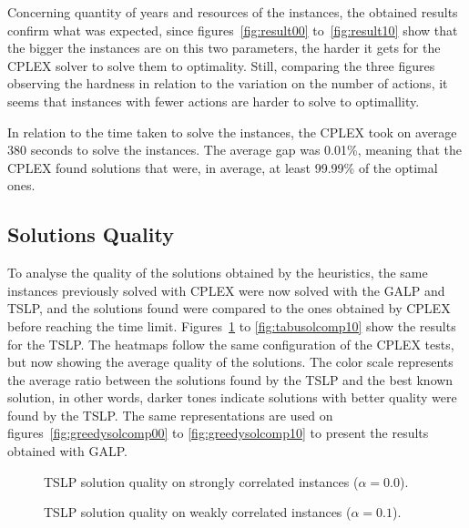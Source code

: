 Concerning quantity of years and resources of the instances, the obtained results confirm what was expected, since 
figures~\ref{fig:result00} to~\ref{fig:result10}
show that the bigger the instances are on this two parameters, the harder it gets for the CPLEX solver to solve them to optimality. 
Still, comparing the three figures observing the hardness in relation to the variation on the number of actions, it seems that instances with fewer actions are 
harder to solve to optimallity.

In relation to the time taken to solve the instances, the CPLEX took on average 380 seconds to solve the instances. The average gap was 
0.01\%, meaning that the CPLEX found solutions that were, in average, at least 99.99\% of the optimal ones.

\subsection{Solutions Quality}

To analyse the quality of the solutions obtained by the heuristics, the same instances previously solved with CPLEX were now solved with
the GALP and TSLP, and the solutions found were compared to the ones obtained by CPLEX before reaching the time limit. 
Figures~\ref{fig:tabusolcomp00} to \ref{fig:tabusolcomp10} show the results for the TSLP. The heatmaps follow the same configuration 
of the CPLEX tests, but now showing the average quality of the solutions. The color scale represents
the average ratio between the solutions found by the TSLP and the best known solution, in other words, darker tones indicate solutions
with better quality were found by the TSLP. The same representations are used on figures~\ref{fig:greedysolcomp00} to \ref{fig:greedysolcomp10} 
to present the results obtained with GALP.

\figpar
\begin{figure}[H]
  \centering
  \resizebox{\columnwidth}{!}{%
    \subfloat[1 resource]{}
    \subfloat[2 resources]{}
    \subfloat[4 resources]{}
  }
  \caption{TSLP solution quality on strongly correlated instances ($\alpha = 0.0$).}
  \label{fig:tabusolcomp00}
\end{figure}

\figspaces
\begin{figure}[H]
  \centering
  \resizebox{\columnwidth}{!}{%
    \subfloat[1 resource]{}
    \subfloat[2 resources]{}
    \subfloat[4 resources]{}
  }
  \caption{TSLP solution quality on weakly correlated instances ($\alpha = 0.1$).}
  \label{fig:tabusolcomp01}
\end{figure}

